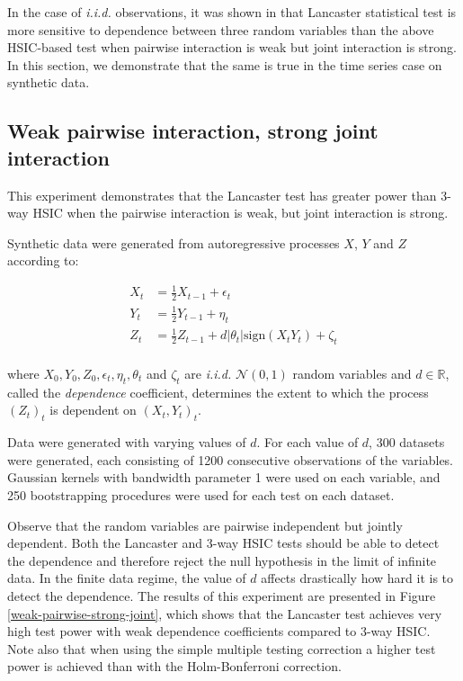 \documentclass[]{article}
\begin{document}
In the case of \emph{i.i.d.} observations, it was shown in \cite{sejdinovic2013kernel} that Lancaster statistical test is more sensitive to dependence between three random variables than the above HSIC-based test when pairwise interaction is weak but joint interaction is strong. In this section, we demonstrate that the same is true in the time series case on synthetic data.




\subsection{Weak pairwise interaction, strong joint interaction}\label{experiment1}

This experiment demonstrates that the Lancaster test has greater power than 3-way HSIC when the pairwise interaction is weak, but joint interaction is strong.


Synthetic data were generated from autoregressive processes $X$, $Y$ and $Z$ according to:

\begin{align*}
X_t &= \frac{1}{2}X_{t-1} + \epsilon_t\\
Y_t &= \frac{1}{2}Y_{t-1} + \eta_t\\
Z_t &= \frac{1}{2}Z_{t-1} + d |\theta_t|\text{sign}(X_t Y_t) + \zeta_t\\
\end{align*}

where $X_0, Y_0, Z_0, \epsilon_t, \eta_t, \theta_t$ and $\zeta_t$ are \emph{i.i.d.} $\mathcal{N}(0,1)$ random variables and $d\in\mathbb{R}$, called the \emph{dependence} coefficient, determines the extent to which the process $(Z_t)_t$ is dependent on $(X_t,Y_t)_t$.

Data were generated with varying values of $d$. For each value of $d$, 300 datasets were generated, each consisting of 1200 consecutive observations of the variables. Gaussian kernels with bandwidth parameter 1 were used on each variable, and 250 bootstrapping procedures were used for each test on each dataset.

Observe that the random variables are pairwise independent but jointly dependent. Both the Lancaster and 3-way HSIC tests should be able to detect the dependence and therefore reject the null hypothesis in the limit of infinite data. In the finite data regime, the value of $d$ affects drastically how hard it is to detect the dependence. The results of this experiment are presented in Figure \ref{weak-pairwise-strong-joint}, which shows that the Lancaster test achieves very high test power with weak dependence coefficients compared to 3-way HSIC. Note also that when using the simple multiple testing correction a higher test power is achieved than with the Holm-Bonferroni correction.
\end{document}

